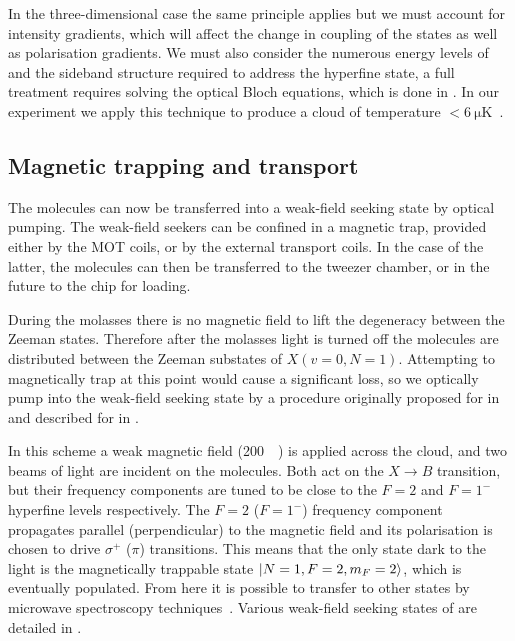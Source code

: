 In the three-dimensional case the same principle applies but we must account
for intensity gradients, which will affect the change in coupling of the states
as well as polarisation gradients. We must also consider the numerous energy
levels of \CaF{} and the sideband structure required to address the hyperfine
state, a full treatment requires solving the optical Bloch equations, which is
done in . In our experiment we apply this
technique to produce a \CaF{} cloud of temperature
$<\SI{6}{\micro\kelvin}$~\cite{PhysRevLett.123.033202}.

\subsection{Magnetic trapping and transport}

The molecules can now be transferred into a weak-field seeking state by optical
pumping. The weak-field seekers can be confined in a magnetic trap, provided
either by the MOT coils, or by the external transport coils. In the case of the
latter, the molecules can then be transferred to the tweezer chamber, or in the
future to the chip for loading.

During the molasses there is no magnetic field to lift the degeneracy between
the Zeeman states. Therefore after the molasses light is turned off the
molecules are distributed between the Zeeman substates of $X(v=0, N=1)$.
Attempting to magnetically trap at this point would cause a significant loss,
so we optically pump into the weak-field seeking state by a procedure originally
proposed for \SrF{} in  %
and described for \CaF{} in .

In this scheme a weak magnetic field (\SI{200}{\milli\gauss}) is applied across
the cloud, and two beams of light are incident on the molecules. Both act on
the $X\rightarrow B$ transition, but their frequency components are tuned to be
close to the $F=2$ and $F=1^-$ hyperfine levels respectively. The $F=2$
($F=1^-$) frequency component propagates parallel (perpendicular) to the
magnetic field and its polarisation is chosen to drive $\sigma^+$ ($\pi$)
transitions. This means that the only state dark to the light is the
magnetically trappable state $\ket{N=1, F=2, m_F=2}$, which is eventually
populated. From here it is possible to transfer to other states by microwave
spectroscopy techniques~\cite{WilliamsMagnetic2018}. Various weak-field seeking
states of \CaF{} are detailed in .


